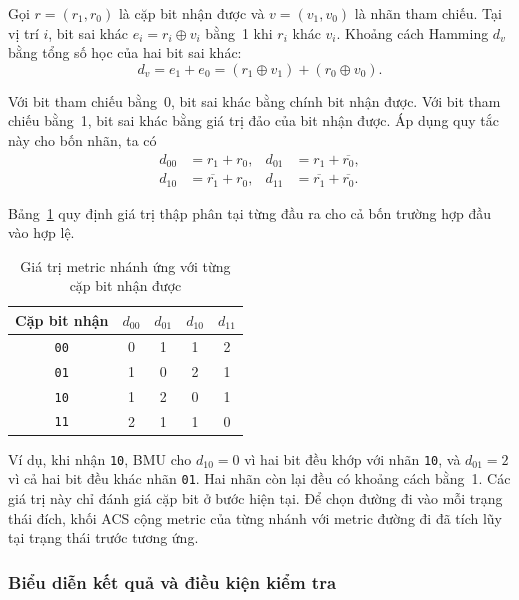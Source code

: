 \documentclass[12pt,a4paper]{article}
\renewcommand{\_}{\originalunderscore\allowbreak}
\begin{document}
Gọi $r=(r_1,r_0)$ là cặp bit nhận được và $v=(v_1,v_0)$ là nhãn
tham chiếu. Tại vị trí $i$, bit sai khác $e_i=r_i\oplus v_i$ bằng~1
khi $r_i$ khác $v_i$. Khoảng cách Hamming $d_v$ bằng tổng số học
của hai bit sai khác:
\begin{equation}
    d_v=e_1+e_0=(r_1\oplus v_1)+(r_0\oplus v_0).
\end{equation}

Với bit tham chiếu bằng~0, bit sai khác bằng chính bit nhận được.
Với bit tham chiếu bằng~1, bit sai khác bằng giá trị đảo của bit
nhận được. Áp dụng quy tắc này cho bốn nhãn, ta có
\begin{equation}
    \begin{aligned}
        d_{00} &= r_1+r_0, &
        d_{01} &= r_1+\overline{r_0}, \\
        d_{10} &= \overline{r_1}+r_0, &
        d_{11} &= \overline{r_1}+\overline{r_0}.
    \end{aligned}
\end{equation}

Bảng~\ref{tab:bmu-truth} quy định giá trị thập phân tại từng đầu ra
cho cả bốn trường hợp đầu vào hợp lệ.

\begin{table}[H]
    \centering
    \small
    \begin{tabular}{@{}ccccc@{}}
        \toprule
        \textbf{Cặp bit nhận} & $d_{00}$ & $d_{01}$ & $d_{10}$ & $d_{11}$ \\
        \midrule
        \texttt{00} & 0 & 1 & 1 & 2 \\
        \texttt{01} & 1 & 0 & 2 & 1 \\
        \texttt{10} & 1 & 2 & 0 & 1 \\
        \texttt{11} & 2 & 1 & 1 & 0 \\
        \bottomrule
    \end{tabular}
    \caption{Giá trị metric nhánh ứng với từng cặp bit nhận được}
    \label{tab:bmu-truth}
\end{table}

Ví dụ, khi nhận \texttt{10}, BMU cho $d_{10}=0$ vì hai bit đều khớp
với nhãn \texttt{10}, và $d_{01}=2$ vì cả hai bit đều khác nhãn
\texttt{01}. Hai nhãn còn lại đều có khoảng cách bằng~1. Các giá trị
này chỉ đánh giá cặp bit ở bước hiện tại. Để chọn đường đi vào mỗi
trạng thái đích, khối ACS cộng metric của từng nhánh với metric đường
đi đã tích lũy tại trạng thái trước tương ứng.

\subsubsection{Biểu diễn kết quả và điều kiện kiểm tra}
\end{document}
